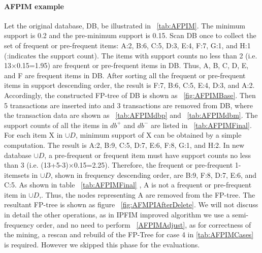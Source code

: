 \paragraph{AFPIM example}
\label{par:AFPIMexample}
Let the original database, DB, be illustrated in ~\ref{tab:AFPIM}. The minimum
support is 0.2 and the pre-minimum support is 0.15. Scan DB once to collect the set of
frequent or pre-frequent items: A:2, B:6, C:5, D:3, E:4, F:7, G:1, and H:1 (:indicates the
support count). The items with support counts no less than 2 (i.e. 13×0.15=1.95) are
frequent or pre-frequent items in DB. Thus, A, B, C, D, E, and F are frequent items in
DB. After sorting all the frequent or pre-frequent items in support descending order, the
result is F:7, B:6, C:5, E:4, D:3, and A:2. Accordingly, the constructed FP-tree of DB is
shown as ~\ref{fig:AFPIMBase}.
Then 5 transactions are inserted into and 3 transactions are removed from DB,
where the transaction data are shown as ~\ref{tab:AFPIMdbp} and ~\ref{tab:AFPIMdbm}. The support counts of all the items in $ db^+ $ and $ db^- $ are listed in ~\ref{tab:AFPIMFinal}. For each item X in $\cup D $,  minimum support of X can be obtained by a simple computation. The result is A:2, B:9, C:5, D:7, E:6, F:8, G:1, and H:2. In new database $\cup D $, a pre-frequent or frequent item must have support counts no less than 3 (i.e. (13+5-3)×0.15=2.25). Therefore, the frequent or pre-frequent 1-itemsets in $\cup D $, shown in frequency descending order, are B:9, F:8, D:7, E:6, and C:5.  As shown in table ~\ref{tab:AFPIMFinal} , A is not a frequent or pre-frequent item in $\cup D $,.
Thus, the nodes representing A are removed from the FP-tree. The resultant FP-tree is shown as figure ~\ref{fig:AFMPIAfterDelete}. We will not discuss in detail the other operations, as in IPFIM improved algorithm we use a semi-frequency order, and no need to perform ~\ref{AFPIMAdjust}, as for correctness of the mining, a rescan and rebuild of the FP-Tree for case 4 in \ref{tab:AFPIMCases} is required.  However we skipped this phase for the evaluations.  
  
